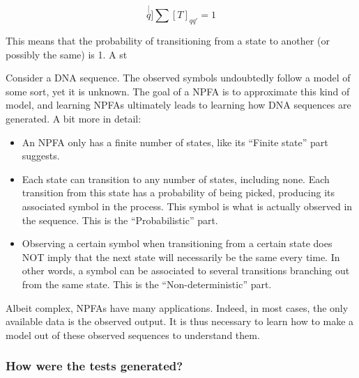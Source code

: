 \[
\stackrel[q]{}{\sum}[T]_{qq'}=1
\]


This means that the probability of transitioning from a state to another
(or possibly the same) is 1. A st

Consider a DNA sequence. The observed symbols undoubtedly follow a
model of some sort, yet it is unknown. The goal of a NPFA is to approximate
this kind of model, and learning NPFAs ultimately leads to learning
how DNA sequences are generated. A bit more in detail:
\begin{itemize}
\item An NPFA only has a finite number of states, like its ``Finite state''
part suggests.
\item Each state can transition to any number of states, including none.
Each transition from this state has a probability of being picked,
producing its associated symbol in the process. This symbol is what
is actually observed in the sequence. This is the ``Probabilistic''
part.
\item Observing a certain symbol when transitioning from a certain state
does NOT imply that the next state will necessarily be the same every
time. In other words, a symbol can be associated to several transitions
branching out from the same state. This is the ``Non-deterministic''
part.
\end{itemize}
Albeit complex, NPFAs have many applications. Indeed, in most cases,
the only available data is the observed output. It is thus necessary
to learn how to make a model out of these observed sequences to understand
them.


\subsubsection{How were the tests generated?}

